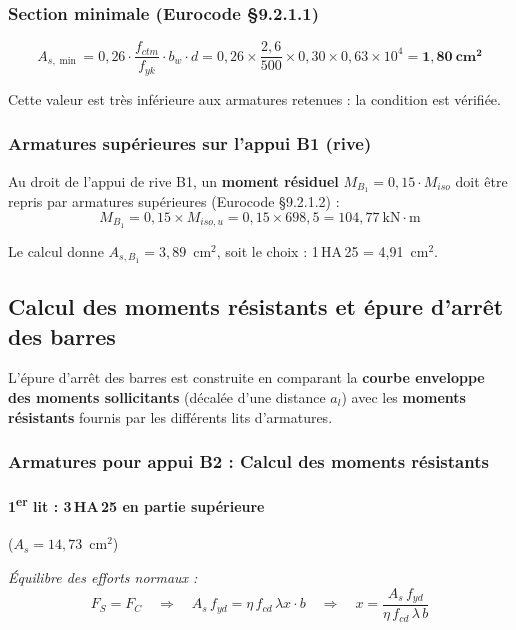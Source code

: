 
\subsubsection{Section minimale (Eurocode \S{}9.2.1.1)}

\[
  A_{s,\min} = 0{,}26 \cdot \frac{f_{ctm}}{f_{yk}} \cdot b_w \cdot d
            = 0{,}26 \times \frac{2{,}6}{500} \times 0{,}30 \times 0{,}63 \times 10^4 = \mathbf{1{,}80~\text{cm}^2}
\]

Cette valeur est très inférieure aux armatures retenues : la condition est vérifiée.

\subsubsection{Armatures supérieures sur l'appui B1 (rive)}

Au droit de l'appui de rive B1, un \textbf{moment résiduel} $M_{B_1} = 0{,}15 \cdot M_{iso}$ doit être repris par armatures supérieures (Eurocode \S{}9.2.1.2) :
\[
  M_{B_1} = 0{,}15 \times M_{iso,u} = 0{,}15 \times 698{,}5 = 104{,}77~\text{kN}\cdot\text{m}
\]

Le calcul donne $A_{s,B_1} = 3{,}89$~cm$^2$, soit le choix : 1\,HA\,25 = 4{,}91~cm$^2$.

\subsection{Calcul des moments résistants et épure d'arrêt des barres}

L'épure d'arrêt des barres est construite en comparant la \textbf{courbe enveloppe des moments sollicitants} (décalée d'une distance $a_l$) avec les \textbf{moments résistants} fournis par les différents lits d'armatures.

\subsubsection{Armatures pour appui B2 : Calcul des moments résistants}

\paragraph{1\textsuperscript{er} lit : 3\,HA\,25 en partie supérieure} ($A_s = 14{,}73$~cm$^2$)

\textit{Équilibre des efforts normaux :}
\[
  F_S = F_C \quad\Longrightarrow\quad
  A_s\,f_{yd} = \eta\,f_{cd}\,\lambda x \cdot b
  \quad\Longrightarrow\quad
  x = \frac{A_s\,f_{yd}}{\eta\,f_{cd}\,\lambda\,b}
\]

